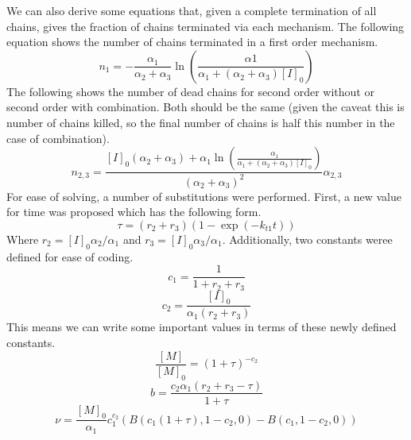 \documentclass[12pt]{article}
\begin{document}
We can also derive some equations that, given a complete termination of all chains, gives the fraction of chains terminated via each mechanism. The following equation shows the number of chains terminated in a first order mechanism.
\begin{equation}
  n_1 = -\frac{\alpha_1}{\alpha_2+\alpha_3}\ln\left(\frac{\alpha1}{\alpha_1+(\alpha_2+\alpha_3)[I]_0}\right)
\end{equation}
The following shows the number of dead chains for second order without or second order with combination. Both should be the same (given the caveat this is number of chains killed, so the final number of chains is half this number in the case of combination).
\begin{equation}
  n_{2,3}=\frac{[I]_0(\alpha_2+\alpha_3)+\alpha_1\ln\left(\frac{\alpha_1}{\alpha_1+(\alpha_2+\alpha_3)[I]_0}\right)}{(\alpha_2+\alpha_3)^2}\alpha_{2,3}
\end{equation}
For ease of solving, a number of substitutions were performed. First, a new value for time was proposed which has the following form.
\begin{equation}
  \tau = (r_2+r_3)(1-\exp(-k_{t1}t))
\end{equation}
Where $r_2=[I]_0\alpha_2/\alpha_1$ and $r_3=[I]_0\alpha_3/\alpha_1$. Additionally, two constants weree defined for ease of coding.
\begin{equation}
  c_1 = \frac{1}{1+r_2+r_3}
\end{equation}
\begin{equation}
  c_2 = \frac{[I]_0}{\alpha_1(r_2+r_3)}
\end{equation}
This means we can write some important values in terms of these newly defined constants.
\begin{equation}
  \frac{[M]}{[M]_0} = (1+\tau)^{-c_2}
\end{equation}
\begin{equation}
  b = \frac{c_2\alpha_1(r_2+r_3-\tau)}{1+\tau}
\end{equation}
\begin{equation}
  \nu = \frac{[M]_0}{\alpha_1}c_1^{c_2}\left(B(c_1(1+\tau),1-c_2,0)-B(c_1,1-c_2,0)\right)
\end{equation}
\end{document}

